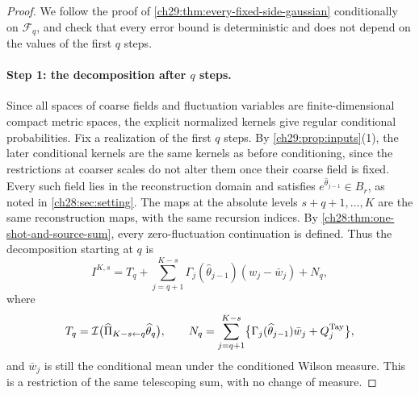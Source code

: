 \begin{proof}
We follow the proof of \cref{ch29:thm:every-fixed-side-gaussian} conditionally on $\mathcal F_q$, and check that every error bound is deterministic and does not depend on the values of the first $q$ steps.

\paragraph{Step 1: the decomposition after $q$ steps.}
Since all spaces of coarse fields and fluctuation variables are finite-dimensional compact metric spaces, the explicit normalized kernels give regular conditional probabilities. Fix a realization of the first $q$ steps. By \cref{ch29:prop:inputs}(1), the later conditional kernels are the same kernels as before conditioning, since the restrictions at coarser scales do not alter them once their coarse field is fixed. Every such field lies in the reconstruction domain and satisfies $e^{\widehat\theta_{j-1}}\in B_r$, as noted in \cref{ch28:sec:setting}. The maps at the absolute levels $s+q+1,\dots,K$ are the same reconstruction maps, with the same recursion indices. By \cref{ch28:thm:one-shot-and-source-sum}, every zero-fluctuation continuation is defined. Thus the decomposition starting at $q$ is
\[
 I^{K,s}=T_q+\sum_{j=q+1}^{K-s}\Gamma_j(\widehat\theta_{j-1})(w_j-\bar w_j)+N_q,
\]
where
\[
 T_q=\mathcal I\bigl(\widehat\Pi_{K-s\leftarrow q}\widehat\theta_q\bigr),\qquad N_q=\sum_{j=q+1}^{K-s}\bigl\{\Gamma_j(\widehat\theta_{j-1})\bar w_j+Q_j^{\rm Tay}\bigr\},
\]
and $\bar w_j$ is still the conditional mean under the conditioned Wilson measure. This is a restriction of the same telescoping sum, with no change of measure.


\end{proof}
